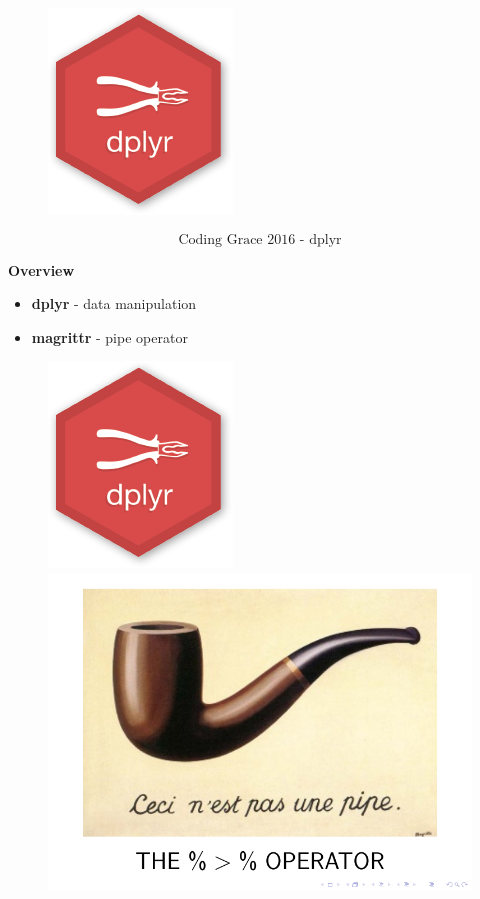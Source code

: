 \documentclass{beamer}
\begin{document}
	
\begin{frame}
\begin{figure}
\centering
\includegraphics[width=0.60\linewidth]{dplyr-hexbin-logo}
\end{figure}
\Large
\[ \mbox{Coding Grace 2016 - dplyr}\]
\end{frame}		
	\begin{frame}
		\vspace{-0.5cm}
		\LARGE
		\textbf{Overview}
		
		\begin{itemize}
			\item \textbf{dplyr} - data manipulation


			\item \textbf{magrittr} - pipe operator
		\end{itemize}
			\begin{figure}
				\centering
				\includegraphics[width=0.35\linewidth]{dplyr-hexbin-logo}
				\includegraphics[width=0.35\linewidth]{magrittr}
			\end{figure}	
\end{frame}
\end{document}
